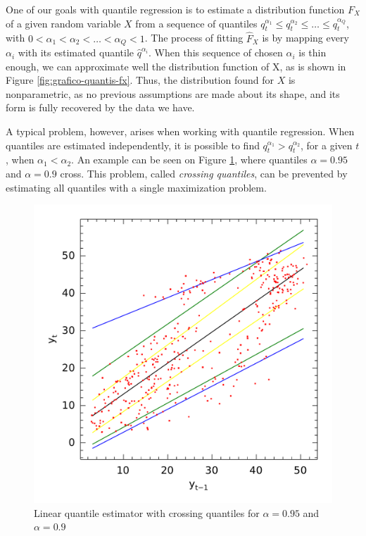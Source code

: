 One of our goals with quantile regression is to estimate a distribution function $F_X$ of a given random variable $X$ from a sequence of quantiles $q^{\alpha_1}_{t} \leq q^{\alpha_2}_{t} \leq \dots \leq q^{\alpha_Q}_{t}$, with $0 < \alpha_1 < \alpha_2 < \dots < \alpha_Q < 1$. 
The process of fitting $\hat{F}_X$ is by mapping every $\alpha_i$ with its estimated quantile $\hat{q}^{\alpha_i}$. 
When this sequence of chosen $\alpha_i$ is thin enough, we can approximate well the distribution function of X, as is shown in Figure \ref{fig:grafico-quantis-fx}. 
Thus, the distribution found for $X$ is nonparametric, as no previous assumptions are made about its shape, and its form is fully recovered by the data we have.
 
A typical problem, however, arises when working with quantile regression. When quantiles are estimated independently, it is possible to find $q^{\alpha_1}_{t} > q^{\alpha_2}_{t}$, for a given $t$, when $\alpha_1 < \alpha_2$. An example can be seen on Figure \ref{fig:crossing-quantiles}, where quantiles $\alpha = 0.95$ and $\alpha = 0.9$ cross. This problem, called \textit{crossing quantiles}, can be prevented by estimating all quantiles with a single maximization problem.
\begin{figure}
	\centering
	\includegraphics[width=0.6\linewidth]{./Figuras/npqar/icaraizinho-crossing-200}
	\caption{Linear quantile estimator with crossing quantiles for $\alpha = 0.95$ and $\alpha = 0.9$}
	\label{fig:crossing-quantiles}
\end{figure}

